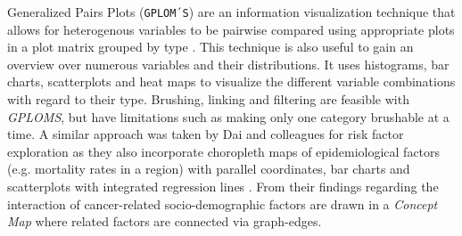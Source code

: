 \documentclass[journal]{style/vgtc} 			          %
\begin{document}
Generalized Pairs Plots (\texttt{GPLOM´S}) are an information visualization technique that allows for heterogenous variables to be pairwise compared using appropriate plots in a plot matrix grouped by type \cite{Francois2013}.
%
This technique is also useful to gain an overview over numerous variables and their distributions.
%
It uses histograms, bar charts, scatterplots and heat maps to visualize the different variable combinations with regard to their type.
%
Brushing, linking and filtering are feasible with \emph{GPLOMS}, but have limitations such as making only one category brushable at a time.
%
%
%
A similar approach was taken by Dai and colleagues for risk factor exploration as they also incorporate choropleth maps of epidemiological factors (e.g. mortality rates in a region) with parallel coordinates, bar charts and scatterplots with integrated regression lines \cite{Dai2005}.
%
From their findings regarding the interaction of cancer-related socio-demographic factors are drawn in a \emph{Concept Map} where related factors are connected via graph-edges.
\end{document}
